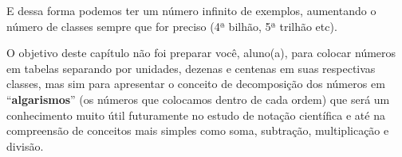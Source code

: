 E dessa forma podemos ter um número infinito de exemplos, aumentando o número de classes sempre que for preciso (4ª bilhão, 5ª trilhão etc).

O objetivo deste capítulo não foi preparar você, aluno(a), para colocar números em tabelas separando por unidades, dezenas e centenas em suas respectivas classes, mas sim para apresentar o conceito de decomposição dos números em “\textbf{algarismos}” (os números que colocamos dentro de cada ordem) que será um conhecimento muito útil futuramente no estudo de notação científica e até na compreensão de conceitos mais simples como soma, subtração, multiplicação e divisão.